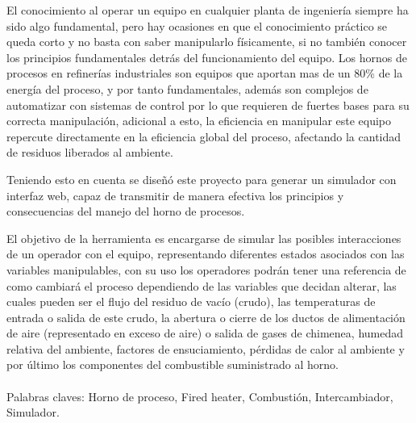 \documentclass[pregrado]{tesis-usb}
\begin{document}
\frontmatter
\maketitle


\begin{resumen}
    \par El conocimiento al operar un equipo en cualquier planta de ingeniería siempre ha sido algo fundamental, pero hay ocasiones en que el conocimiento práctico se queda corto y no basta con saber manipularlo físicamente, si no también conocer los principios fundamentales detrás del funcionamiento del equipo. Los hornos de procesos en refinerías industriales son equipos que aportan mas de un 80\% de la energía del proceso, y por tanto fundamentales, además son complejos de automatizar con sistemas de control por lo que requieren de fuertes bases para su correcta manipulación, adicional a esto, la eficiencia en manipular este equipo repercute directamente en la eficiencia global del proceso, afectando la cantidad de residuos liberados al ambiente.
    \par Teniendo esto en cuenta se diseñó este proyecto para generar un simulador con interfaz web, capaz de transmitir de manera efectiva los principios y consecuencias del manejo del horno de procesos.
    \par El objetivo de la herramienta es encargarse de simular las posibles interacciones de un operador con el equipo, representando diferentes estados asociados con las variables manipulables, con su uso los operadores podrán tener una referencia de como cambiará el proceso dependiendo de las variables que decidan alterar, las cuales pueden ser el flujo del residuo de vacío (crudo), las temperaturas de entrada o salida de este crudo, la abertura o cierre de los ductos de alimentación de aire (representado en exceso de aire) o salida de gases de chimenea, humedad relativa del ambiente, factores de ensuciamiento, pérdidas de calor al ambiente y por último los componentes del combustible suministrado al horno.\\
     \vspace{10pt}\\
     Palabras claves: Horno de proceso, Fired heater, Combustión, Intercambiador, Simulador.
\end{resumen}
\tableofcontents
\listoffigures
\listoftables
\useacronyms
%

\mainmatter





%

\nocite{*}

\appendix



\end{document}
